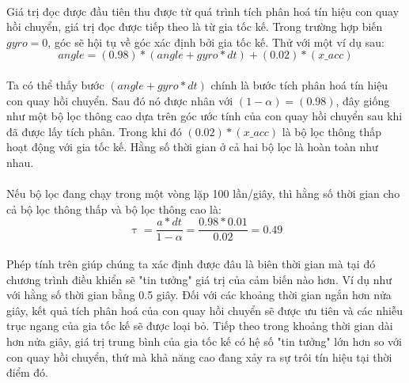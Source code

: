 \paragraph{}Giá trị đọc được đầu tiên thu được từ quá trình tích phân hoá tín hiệu con quay hồi chuyển, giá trị đọc được tiếp theo là từ gia tốc kế. Trong trường hợp biến $gyro = 0$, góc sẽ hội tụ về góc xác định bởi gia tốc kế. Thử với một ví dụ sau:
\begin{equation}
angle = (0.98)*(angle + gyro*dt) + (0.02)*(x\_acc)
\end{equation}
\paragraph{}Ta có thể thấy bước $(angle +gyro *dt)$ chính là bước tích phân hoá tín hiệu con quay hồi chuyển. Sau đó nó được nhân với $(1 - \alpha) = (0.98)$, đây giống như một bộ lọc thông cao dựa trên góc ước tính của con quay hồi chuyển sau khi đã được lấy tích phân. Trong khi đó $(0.02)*(x\_acc)$ là bộ lọc thông thấp hoạt động với gia tốc kế. Hằng số thời gian ở cả hai bộ lọc là hoàn toàn như nhau. 
\paragraph{}Nếu bộ lọc đang chạy trong một vòng lặp 100 lần/giây, thì hằng số thời gian cho cả bộ lọc thông thấp và bộ lọc thông cao là:
\begin{equation}
\uptau = \dfrac{a * dt}{1-\alpha} = \dfrac{0.98 * 0.01}{0.02} = 0.49 
\end{equation}
\paragraph{}Phép tính trên giúp chúng ta xác định được đâu là biên thời gian mà tại đó chương trình điều khiển sẽ "tin tưởng" giá trị của cảm biến nào hơn. Ví dụ như với hằng số thời gian bằng 0.5 giây. Đối với các khoảng thời gian ngắn hơn nửa giây, kết quả tích phân hoá của con quay hồi chuyển sẽ được ưu tiên và các nhiễu trục ngang của gia tốc kế sẽ được loại bỏ. Tiếp theo trong khoảng thời gian dài hơn nửa giây, giá trị trung bình của gia tốc kế có hệ số "tin tưởng" lớn hơn so với con quay hồi chuyển, thứ mà khả năng cao đang xảy ra sự trôi tín hiệu tại thời điểm đó. 
